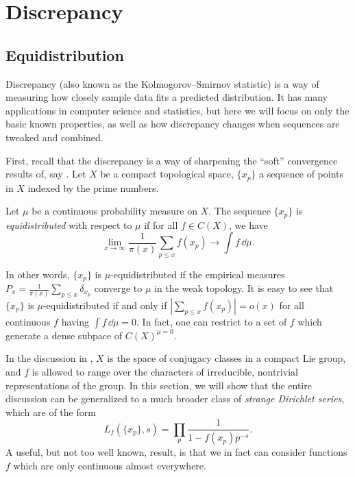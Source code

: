 
\chapter{Discrepancy}





\section{Equidistribution}

Discrepancy (also known as the Kolmogorov--Smirnov statistic) is a way of 
measuring how closely sample data fits a predicted distribution. It has many 
applications in computer science and statistics, but here we will focus on only 
the basic known properties, as well as how discrepancy changes when sequences 
are tweaked and combined. 

First, recall that the discrepancy is a way of sharpening the ``soft'' 
convergence results of, say \cite[A.1]{serre-1989}. Let $X$ be a compact 
topological space, $\{x_p\}$ a sequence of points in $X$ indexed by the prime 
numbers. 

\begin{definition}
Let $\mu$ be a continuous probability measure on $X$. The sequence $\{x_p\}$ is 
\emph{equidistributed} with respect to $\mu$ if for all $f\in C(X)$, we have 
\[
	\lim_{x\to \infty} \frac{1}{\pi(x)} \sum_{p\leqslant x} f(x_p) \to \int f\, \dd \mu .
\]
\end{definition}

In other words, $\{x_p\}$ is $\mu$-equidistributed if the empirical measures 
$P_x = \frac{1}{\pi(x)} \sum_{p\leqslant x} \delta_{x_p}$ converge to $\mu$ in 
the weak topology. It is easy to see that $\{x_p\}$ is $\mu$-equidistributed if 
and only if $\left| \sum_{p\leqslant x} f(x_p)\right| = o(x)$ for all 
continuous $f$ having $\int f\, \dd\mu = 0$. In fact, one can restrict to a 
set of $f$ which generate a dense subpace of $C(X)^{\mu =0}$. 

In the discussion in \cite[A.1]{serre-1989}, $X$ is the space of conjugacy 
classes in a compact Lie group, and $f$ is allowed to range over the characters 
of irreducible, nontrivial representations of the group. In this section, we 
will show that the entire discussion can be generalized to a much broader class 
of \emph{strange Dirichlet series}, which are of the form 
\[
	L_f(\{x_p\},s) = \prod_p \frac{1}{1-f(x_p)p^{-s}} .
\]
A useful, but not too well known, result, is that we in fact can consider 
functions $f$ which are only continuous almost everywhere. 

